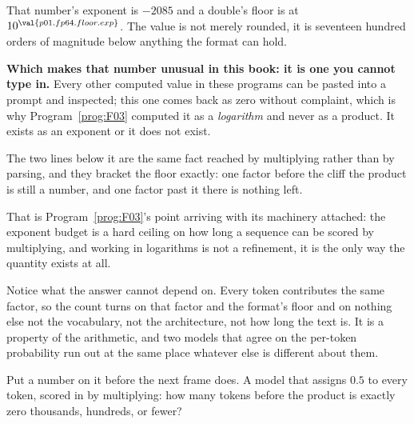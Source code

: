 \begin{fr}
That number's exponent is $-2085$ and a double's floor is at
$10^{\val{p01.fp64.floor.exp}}$. The value is not merely rounded, it is
seventeen hundred orders of magnitude below anything the format can hold.


\begin{note}
\textbf{Which makes that number unusual in this book: it is one you cannot
type in.} Every other computed value in these programs can be pasted into a
prompt and inspected; this one comes back as zero without complaint, which is
why Program~\ref{prog:F03} computed it as a \emph{logarithm} and never as a
product. It exists as an exponent or it does not exist.

The two lines below it are the same fact reached by multiplying rather than by
parsing, and they bracket the floor exactly: one factor before the cliff the
product is still a number, and one factor past it there is nothing left.
\end{note}

That is Program~\ref{prog:F03}'s point arriving with its machinery attached:
the exponent budget is a hard ceiling on how long a sequence can be scored by
multiplying, and working in logarithms is not a refinement, it is the only way
the quantity exists at all.

Notice what the answer cannot depend on. Every token contributes the same
factor, so the count turns on that factor and the format's floor and on
nothing else \dash{} not the vocabulary, not the architecture, not how long
the text is. It is a property of the arithmetic, and two models that agree on
the per-token probability run out at the same place whatever else is different
about them.

Put a number on it before the next frame does. A model that assigns
$\num{0.5}$ to every token, scored in  by multiplying: how many
tokens before the product is exactly zero \dash{} thousands, hundreds, or
fewer?
\dotline
\nextframe
\end{fr}

